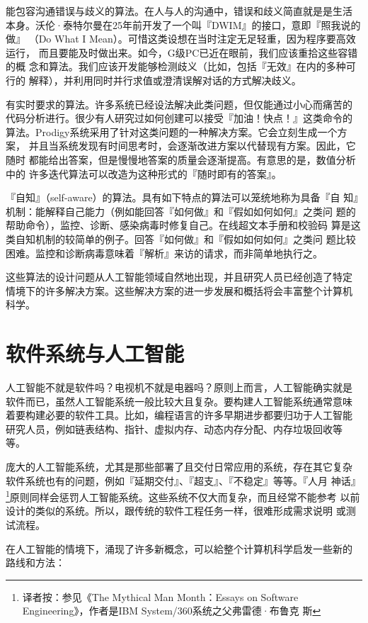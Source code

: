 \documentclass[12pt,a4paper]{article}
\begin{document}
能包容沟通错误与歧义的算法。在人与人的沟通中，错误和歧义简直就是是生活
本身。沃伦·泰特尔曼在25年前开发了一个叫『DWIM』的接口，意即『照我说的做』
（Do What I Mean）。可惜这类设想在当时注定无足轻重，因为程序要高效运行，
而且要能及时做出来。如今，G级PC已近在眼前，我们应该重拾这些容错的概
念和算法。我们应该开发能够检测歧义（比如，包括『无效』在内的多种可行的
解释），并利用同时并行求值或澄清误解对话的方式解决歧义。

有实时要求的算法。许多系统已经设法解决此类问题，但仅能通过小心而痛苦的
代码分析进行。很少有人研究过如何创建可以接受『加油！快点！』这类命令的
算法。Prodigy系统采用了针对这类问题的一种解决方案。它会立刻生成一个方案，
并且当系统发现有时间思考时，会逐渐改进方案以代替现有方案。因此，它随时
都能给出答案，但是慢慢地答案的质量会逐渐提高。有意思的是，数值分析中的
许多迭代算法可以改造为这种形式的『随时即有的答案』。

『自知』（self-aware）的算法。具有如下特点的算法可以笼统地称为具备『自
知』机制：能解释自己能力（例如能回答『如何做』和『假如如何如何』之类问
题的帮助命令），监控、诊断、感染病毒时修复自己。在线超文本手册和校验码
算是这类自知机制的较简单的例子。回答『如何做』和『假如如何如何』之类问
题比较困难。监控和诊断病毒意味着『解析』来访的请求，而非简单地执行之。

这些算法的设计问题从人工智能领域自然地出现，并且研究人员已经创造了特定
情境下的许多解决方案。这些解决方案的进一步发展和概括将会丰富整个计算机
科学。

\section{软件系统与人工智能}

人工智能不就是软件吗？电视机不就是电器吗？原则上而言，人工智能确实就是
软件而已，虽然人工智能系统一般比较大且复杂。要构建人工智能系统通常意味
着要构建必要的软件工具。比如，编程语言的许多早期进步都要归功于人工智能
研究人员，例如链表结构、指针、虚拟内存、动态内存分配、内存垃圾回收等
等。

庞大的人工智能系统，尤其是那些部署了且交付日常应用的系统，存在其它复杂
软件系统也有的问题，例如『延期交付』、『超支』、『不稳定』等等。『人月
神话』\footnote{译者按：参见《The Mythical Man Month：Essays on
  Software Engineering》，作者是IBM System/360系统之父弗雷德·布鲁克
  斯}原则同样会惩罚人工智能系统。这些系统不仅大而复杂，而且经常不能参考
以前设计的类似的系统。所以，跟传统的软件工程任务一样，很难形成需求说明
或测试流程。

在人工智能的情境下，涌现了许多新概念，可以給整个计算机科学启发一些新的
路线和方法：
\end{document}
